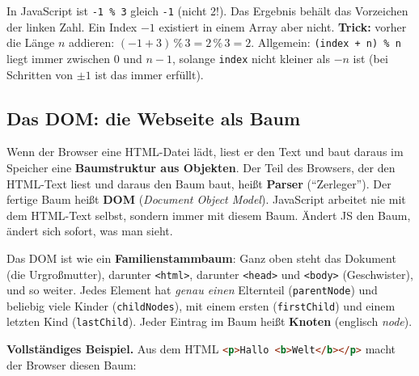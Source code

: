 \documentclass[a4paper,11pt]{article}
\newcommand{\ws}{\textvisiblespace}
\newcommand{\qq}[1]{\textquotedbl#1\textquotedbl}
\begin{document}
\begin{merkbox}[title={Merke -- Falle bei negativen Zahlen}]
In JavaScript ist \lstinline|-1 % 3| gleich \lstinline|-1| (nicht 2!). Das Ergebnis behält das Vorzeichen der linken Zahl.
Ein Index $-1$ existiert in einem Array aber nicht. \textbf{Trick:} vorher die Länge $n$ addieren:
$(-1 + 3) \,\%\, 3 = 2 \,\%\, 3 = 2$. Allgemein: \lstinline|(index + n) % n| liegt immer zwischen $0$ und $n-1$,
solange \texttt{index} nicht kleiner als $-n$ ist (bei Schritten von $\pm 1$ ist das immer erfüllt).
\end{merkbox}

\subsection{Das DOM: die Webseite als Baum}\label{sec:dom}

Wenn der Browser eine HTML-Datei lädt, liest er den Text und baut daraus im Speicher eine
\textbf{Baumstruktur aus Objekten}. Der Teil des Browsers, der den HTML-Text liest und daraus den Baum baut,
heißt \textbf{Parser} ("`Zerleger"'). Der fertige Baum heißt \textbf{DOM} (\emph{Document Object Model}). JavaScript arbeitet
nie mit dem HTML-Text selbst, sondern immer mit diesem Baum. Ändert JS den Baum, ändert sich sofort, was man sieht.

\begin{analogie}
Das DOM ist wie ein \textbf{Familienstammbaum}: Ganz oben steht das Dokument (die Urgroßmutter), darunter
\texttt{<html>}, darunter \texttt{<head>} und \texttt{<body>} (Geschwister), und so weiter. Jedes Element hat
\emph{genau einen} Elternteil (\texttt{parentNode}) und beliebig viele Kinder (\texttt{childNodes}), mit einem
ersten (\texttt{firstChild}) und einem letzten Kind (\texttt{lastChild}). Jeder Eintrag im Baum heißt \textbf{Knoten}
(englisch \emph{node}).
\end{analogie}

\textbf{Vollständiges Beispiel.} Aus dem HTML \lstinline[language=HTML]|<p>Hallo <b>Welt</b></p>| macht der Browser diesen Baum:

\begin{center}
\end{center}
\end{document}
